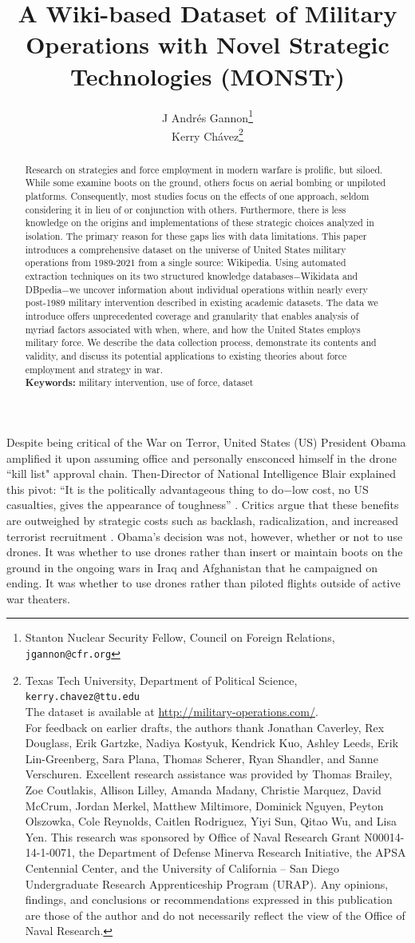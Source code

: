 \documentclass[fleqn,12pt]{article}
\title{\singlespacing A Wiki-based Dataset of Military Operations with Novel Strategic Technologies (MONSTr)}
\author{J Andr\'{e}s Gannon{\thanks{Stanton Nuclear Security Fellow, Council on Foreign Relations, \texttt{jgannon@cfr.org}}} \\ Kerry Ch\'{a}vez{\thanks{Texas Tech University, Department of Political Science, \texttt{kerry.chavez@ttu.edu} \\
The dataset is available at \href{http://military-operations.com/}{http://military-operations.com/}. \\
For feedback on earlier drafts, the authors thank Jonathan Caverley, Rex Douglass, Erik Gartzke, Nadiya Kostyuk, Kendrick Kuo, Ashley Leeds, Erik Lin-Greenberg, Sara Plana, Thomas Scherer, Ryan Shandler, and Sanne Verschuren. Excellent research assistance was provided by Thomas Brailey, Zoe Coutlakis, Allison Lilley, Amanda Madany, Christie Marquez, David McCrum, Jordan Merkel, Matthew Miltimore, Dominick Nguyen, Peyton Olszowka, Cole Reynolds, Caitlen Rodriguez, Yiyi Sun, Qitao Wu, and Lisa Yen. This research was sponsored by Office of Naval Research Grant N00014-14-1-0071, the Department of Defense Minerva Research Initiative, the APSA Centennial Center, and the University of California -- San Diego Undergraduate Research Apprenticeship Program (URAP). Any opinions, findings, and conclusions or recommendations expressed in this publication are those of the author and do not necessarily reflect the view of the Office of Naval Research.}}}
\date{}
\begin{document}
	\maketitle
	\thispagestyle{empty}
	\setcounter{page}{0}
	\vspace{-0.4in}
	\begin{abstract}
            \singlespacing \noindent Research on strategies and force employment in modern warfare is prolific, but siloed. While some examine boots on the ground, others focus on aerial bombing or unpiloted platforms. Consequently, most studies focus on the effects of one approach, seldom considering it in lieu of or conjunction with others. Furthermore, there is less knowledge on the origins and implementations of these strategic choices analyzed in isolation. The primary reason for these gaps lies with data limitations. This paper introduces a comprehensive dataset on the universe of United States military operations from 1989-2021 from a single source: Wikipedia. Using automated extraction techniques on its two structured knowledge databases$-$Wikidata and DBpedia$-$we uncover information about individual operations within nearly every post-1989 military intervention described in existing academic datasets. The data we introduce offers unprecedented coverage and granularity that enables analysis of myriad factors associated with when, where, and how the United States employs military force. We describe the data collection process, demonstrate its contents and validity, and discuss its potential applications to existing theories about force employment and strategy in war. \\ \vspace{.1in}
	\noindent
	\textbf{Keywords:} military intervention, use of force, dataset
	\end{abstract}
	
\newpage
\noindent

Despite being critical of the War on Terror, United States (US) President Obama amplified it upon assuming office and personally ensconced himself in the drone ``kill list" approval chain. Then-Director of National Intelligence Blair explained this pivot: ``It is the politically advantageous thing to do$-$low cost, no US casualties, gives the appearance of toughness” \citep{becker_secretkilllist_2012}. Critics argue that these benefits are outweighed by strategic costs such as backlash, radicalization, and increased terrorist recruitment \citep{kilcullen_opiniondeathoutrage_2009}. Obama's decision was not, however, whether or not to use drones. It was whether to use drones rather than insert or maintain boots on the ground in the ongoing wars in Iraq and Afghanistan that he campaigned on ending. It was whether to use drones rather than piloted flights outside of active war theaters.
	
\end{document}
